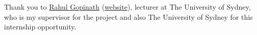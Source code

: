 \chapter*{}

Thank you to \href{mailto:rahul.gopinath@sydney.edu.au}{Rahul Gopinath} (\href{https://rahul.gopinath.org/}{website}), lecturer at The University of Sydney, who is my supervisor for the project and also The University of Sydney for this internship opportunity.
